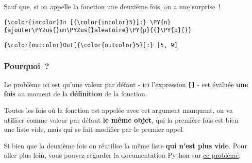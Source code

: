     Sauf que, si on appelle la fonction une deuxième fois, on a une
surprise~!

    \begin{Verbatim}[commandchars=\\\{\},frame=single,framerule=0.3mm,rulecolor=\color{cellframecolor}]
{\color{incolor}In [{\color{incolor}5}]:} \PY{n}{ajouter\PYZus{}un\PYZus{}aleatoire}\PY{p}{(}\PY{p}{)}
\end{Verbatim}


\begin{Verbatim}[commandchars=\\\{\},frame=single,framerule=0.3mm,rulecolor=\color{cellframecolor}]
{\color{outcolor}Out[{\color{outcolor}5}]:} [5, 9]
\end{Verbatim}
            
    \hypertarget{pourquoi}{%
\subsubsection{Pourquoi~?}\label{pourquoi}}

    Le problème ici est qu'une valeur par défaut - ici l'expression
\texttt{{[}{]}} - est évaluée \textbf{une fois} au moment de la
\textbf{définition} de la fonction.

Toutes les fois où la fonction est appelée avec cet argument manquant,
on va utiliser comme valeur par défaut \textbf{le même objet}, qui la
première fois est bien une liste vide, mais qui se fait modifier par le
premier appel.

Si bien que la deuxième fois on réutilise la même liste \textbf{qui
n'est plus vide}. Pour aller plus loin, vous pouvez regarder la
documentation Python sur
\href{https://docs.python.org/3/faq/programming.html\#why-are-default-values-shared-between-objects}{ce
problème}.


    
    
    

